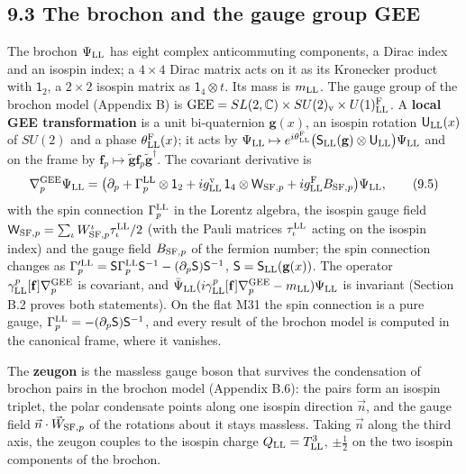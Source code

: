 \documentclass[
  10pt,
]{article}
\begin{document}
\hypertarget{the-brochon-and-the-gauge-group-gee}{%
\subsection{9.3 The brochon and the gauge group
GEE}\label{the-brochon-and-the-gauge-group-gee}}

The brochon \(\Psi_{\rm LL}\) has eight complex anticommuting
components, a Dirac index and an isospin index; a \(4\times4\) Dirac
matrix acts on it as its Kronecker product with \(\mathsf 1_2\), a
\(2\times2\) isospin matrix as \(\mathsf 1_4\otimes t\). Its mass is
\(m_{\rm LL}\). The gauge group of the brochon model (Appendix B) is
\(\mathrm{GEE}=SL(2,\mathbb C)\times SU(2)_{\rm v}\times U(1)^{\rm F}_{\rm LL}\).
A \textbf{local GEE transformation} is a unit bi-quaternion
\(\mathbf g(x)\), an isospin rotation \(\mathsf U_{\rm LL}(x)\) of
\(SU(2)\) and a phase \(\theta^{\rm F}_{\rm LL}(x)\); it acts by
\(\Psi_{\rm LL}\mapsto e^{i\theta^{\rm F}_{\rm LL}}\big(\mathsf S_{\rm LL}(\mathbf g)\otimes\mathsf U_{\rm LL}\big)\Psi_{\rm LL}\)
and on the frame by
\(\mathbf f_p\mapsto\tilde{\mathbf g}\mathbf f_p\tilde{\mathbf g}^\dagger\).
The covariant derivative is
\[\nabla^{\rm GEE}_p\Psi_{\rm LL}=\big(\partial_p+\Gamma^{\rm LL}_p\otimes\mathsf 1_2+ig^{\rm v}_{\rm LL}\,\mathsf 1_4\otimes\mathsf W_{{\rm SF},p}+ig^{\rm F}_{\rm LL}B_{{\rm SF},p}\big)\Psi_{\rm LL},\tag{9.5}\]
with the spin connection \(\Gamma^{\rm LL}_p\) in the Lorentz algebra,
the isospin gauge field
\(\mathsf W_{{\rm SF},p}=\sum_\iota W^\iota_{{\rm SF},p}\tau^{\rm LL}_\iota/2\)
(with the Pauli matrices \(\tau^{\rm LL}_\iota\) acting on the isospin
index) and the gauge field \(B_{{\rm SF},p}\) of the fermion number; the
spin connection changes as
\(\Gamma'^{\rm LL}_p=\mathsf S\Gamma^{\rm LL}_p\mathsf S^{-1}-(\partial_p\mathsf S)\mathsf S^{-1}\),
\(\mathsf S=\mathsf S_{\rm LL}(\mathbf g(x))\). The operator
\(\gamma^p_{\rm LL}[\mathbf f]\nabla^{\rm GEE}_p\) is covariant, and
\(\bar\Psi_{\rm LL}(i\gamma^p_{\rm LL}[\mathbf f]\nabla^{\rm GEE}_p-m_{\rm LL})\Psi_{\rm LL}\)
is invariant (Section B.2 proves both statements). On the flat M31 the
spin connection is a pure gauge,
\(\Gamma^{\rm LL}_p=-(\partial_p\mathsf S)\mathsf S^{-1}\), and every
result of the brochon model is computed in the canonical frame, where it
vanishes.

The \textbf{zeugon} is the massless gauge boson that survives the
condensation of brochon pairs in the brochon model (Appendix B.6): the
pairs form an isospin triplet, the polar condensate points along one
isospin direction \(\vec n\), and the gauge field
\(\vec n\cdot\vec W_{{\rm SF},p}\) of the rotations about it stays
massless. Taking \(\vec n\) along the third axis, the zeugon couples to
the isospin charge \(Q_{\rm LL}=T^3_{\rm LL}\), \(\pm\tfrac12\) on the
two isospin components of the brochon.
\end{document}
